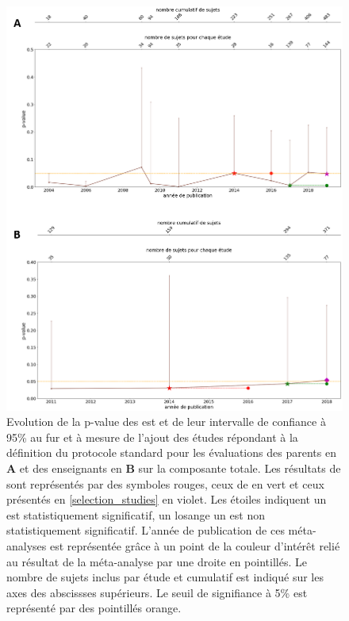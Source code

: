 \begin{itemize}
\begin{figure}[h!]
  \centering
	\includegraphics[width=1\linewidth]{figures/chapter-2/meta-analysis-evolution-pvalue-std} 
  \caption{Evolution de la p-value des \gls{est} et de leur intervalle de confiance à 95\% au fur et à mesure de l'ajout des études répondant à la définition du protocole standard pour les évaluations des 
	parents en \textbf{A} et des enseignants en \textbf{B} sur la composante totale.
  Les résultats de \citep{Cortese2016} sont représentés par des symboles rouges, ceux de \citet{Bussalb2019clinical} en vert et ceux présentés en \ref{selection_studies} en violet. Les étoiles 
	indiquent un \gls{est} statistiquement significatif, un losange un \gls{est} non statistiquement significatif. L'année de publication de ces méta-analyses est représentée grâce à un point de la couleur 
	d'intérêt relié au résultat de la méta-analyse par une droite en pointillés.
	Le nombre de sujets inclus par étude et cumulatif est indiqué sur les axes des abscissses supérieurs.
	Le seuil de signifiance à 5\% est représenté par des pointillés orange.}
  \label{Figure:meta_analysis_evolution_pvalue_std}
\end{figure}


\end{itemize}
